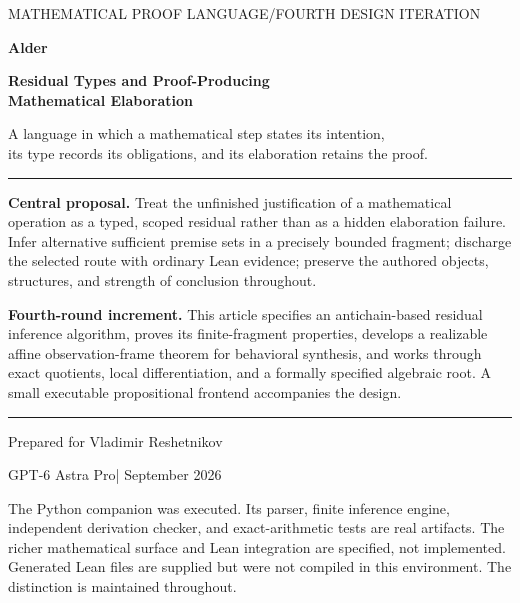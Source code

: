 \documentclass[11pt,a4paper]{article}
\theoremstyle{plain}
\theoremstyle{definition}
\theoremstyle{remark}
\begin{document}
\hypersetup{pageanchor=false}
\begin{titlepage}
\vspace*{8mm}
{\small\sffamily\color{muted}MATHEMATICAL PROOF LANGUAGE\quad /\quad FOURTH DESIGN ITERATION\par}
\vspace{15mm}
{\sffamily\bfseries\color{oliveink}\fontsize{42}{48}\selectfont Alder\par}
\vspace{6mm}
{\sffamily\bfseries\color{ink}\fontsize{23}{29}\selectfont Residual Types and Proof-Producing\\Mathematical Elaboration\par}
\vspace{9mm}
{\large A language in which a mathematical step states its intention,\\its type records its obligations, and its elaboration retains the proof.\par}
\vspace{12mm}
\hrule\vspace{5mm}
\textbf{Central proposal.} Treat the unfinished justification of a mathematical operation as a typed, scoped residual rather than as a hidden elaboration failure. Infer alternative sufficient premise sets in a precisely bounded fragment; discharge the selected route with ordinary Lean evidence; preserve the authored objects, structures, and strength of conclusion throughout.

\textbf{Fourth-round increment.} This article specifies an antichain-based residual inference algorithm, proves its finite-fragment properties, develops a realizable affine observation-frame theorem for behavioral synthesis, and works through exact quotients, local differentiation, and a formally specified algebraic root. A small executable propositional frontend accompanies the design.
\vspace{5mm}\hrule
\vfill
{\sffamily Prepared for Vladimir Reshetnikov\par}
{\sffamily GPT-6 Astra Pro\quad| September 2026\par}
\vspace{5mm}
{\small\color{muted}The Python companion was executed. Its parser, finite inference engine, independent derivation checker, and exact-arithmetic tests are real artifacts. The richer mathematical surface and Lean integration are specified, not implemented. Generated Lean files are supplied but were not compiled in this environment. The distinction is maintained throughout.\par}
\end{titlepage}
\hypersetup{pageanchor=true}
\end{document}
